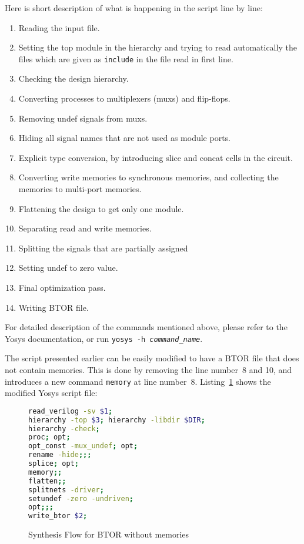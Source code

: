 \documentclass[9pt,technote,a4paper]{IEEEtran}
\begin{document}
Here is short description of what is happening in the script line by
line:

\begin{enumerate}
\item Reading the input file.
\item Setting the top module in the hierarchy and trying to read
  automatically the files which are given as {\tt include} in the file
  read in first line.
\item Checking the design hierarchy.
\item Converting processes to multiplexers (muxs) and flip-flops.
\item Removing undef signals from muxs.
\item Hiding all signal names that are not used as module ports.
\item Explicit type conversion, by introducing slice and concat cells
  in the circuit.
\item Converting write memories to synchronous memories, and
  collecting the memories to multi-port memories.
\item Flattening the design to get only one module.
\item Separating read and write memories.
\item Splitting the signals that are partially assigned
\item Setting undef to zero value.
\item Final optimization pass.
\item Writing BTOR file.
\end{enumerate}

For detailed description of the commands mentioned above, please refer
to the Yosys documentation, or run {\tt yosys -h \it command\_name}.

The script presented earlier can be easily modified to have a BTOR
file that does not contain memories. This is done by removing the line
number~8 and 10, and introduces a new command {\tt memory} at line
number~8. Listing~\ref{btor_script_without_memory} shows the
modified Yosys script file:

\begin{figure}[H]
\begin{lstlisting}[language=sh,numbers=none]
read_verilog -sv $1;
hierarchy -top $3; hierarchy -libdir $DIR;
hierarchy -check;
proc; opt;
opt_const -mux_undef; opt;
rename -hide;;;
splice; opt;
memory;;
flatten;;
splitnets -driver;
setundef -zero -undriven;
opt;;;
write_btor $2;
\end{lstlisting}
 \renewcommand{\figurename}{Listing}
\caption{Synthesis Flow for BTOR without memories}
\label{btor_script_without_memory}
\end{figure}
\end{document}
